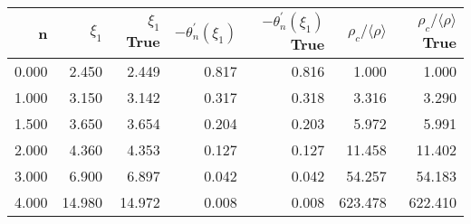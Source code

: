 \begin{tabular}{rrrrrrr}
\toprule
    n &  $\xi_1$ &  $\xi_1$ True &  $-\theta_n^\prime(\xi_1)$ &  $-\theta_n^\prime(\xi_1)$ True &  $\rho_c/\langle\rho\rangle$ &  $\rho_c/\langle\rho\rangle$ True \\
\midrule
0.000 &    2.450 &         2.449 &                      0.817 &                           0.816 &                        1.000 &                             1.000 \\
1.000 &    3.150 &         3.142 &                      0.317 &                           0.318 &                        3.316 &                             3.290 \\
1.500 &    3.650 &         3.654 &                      0.204 &                           0.203 &                        5.972 &                             5.991 \\
2.000 &    4.360 &         4.353 &                      0.127 &                           0.127 &                       11.458 &                            11.402 \\
3.000 &    6.900 &         6.897 &                      0.042 &                           0.042 &                       54.257 &                            54.183 \\
4.000 &   14.980 &        14.972 &                      0.008 &                           0.008 &                      623.478 &                           622.410 \\
\bottomrule
\end{tabular}
